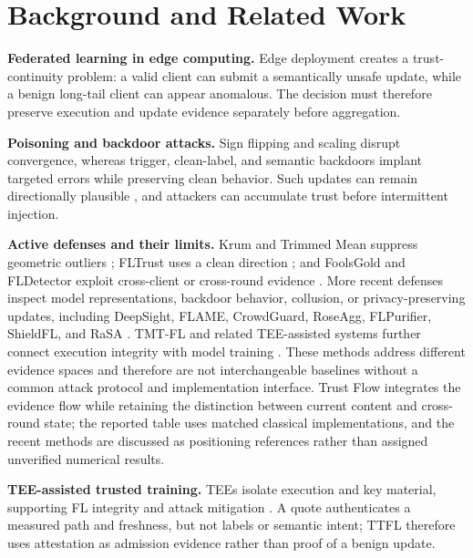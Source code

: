 \documentclass[conference,compsoc]{IEEEtran}
\begin{document}
\section{Background and Related Work}

\textbf{Federated learning in edge computing.} Edge deployment creates a trust-continuity problem: a valid client can submit a semantically unsafe update, while a benign long-tail client can appear anomalous. The decision must therefore preserve execution and update evidence separately before aggregation.

\textbf{Poisoning and backdoor attacks.} Sign flipping and scaling disrupt convergence, whereas trigger, clean-label, and semantic backdoors implant targeted errors while preserving clean behavior. Such updates can remain directionally plausible \cite{bagdasaryan2020backdoor,wang2019neuralcleanse}, and attackers can accumulate trust before intermittent injection.

\textbf{Active defenses and their limits.} Krum and Trimmed Mean suppress geometric outliers \cite{blanchard2017krum,yin2018byzantine}; FLTrust uses a clean direction \cite{cao2021fltrust}; and FoolsGold and FLDetector exploit cross-client or cross-round evidence \cite{fung2020foolsgold,fldetector2022}. More recent defenses inspect model representations, backdoor behavior, collusion, or privacy-preserving updates, including DeepSight, FLAME, CrowdGuard, RoseAgg, FLPurifier, ShieldFL, and RaSA \cite{deepsight2022,flame2022,crowdguard2024,roseagg,flpurifier,shieldfl,wang2025rasa}. TMT-FL and related TEE-assisted systems further connect execution integrity with model training \cite{lu2025tmt}. These methods address different evidence spaces and therefore are not interchangeable baselines without a common attack protocol and implementation interface. Trust Flow integrates the evidence flow while retaining the distinction between current content and cross-round state; the reported table uses matched classical implementations, and the recent methods are discussed as positioning references rather than assigned unverified numerical results.

\textbf{TEE-assisted trusted training.} TEEs isolate execution and key material, supporting FL integrity and attack mitigation \cite{r1_tee_integrity,xu2021distributed,zhang2025rppfl,r5_tee_mitigating,lu2025tmt}. A quote authenticates a measured path and freshness, but not labels or semantic intent; TTFL therefore uses attestation as admission evidence rather than proof of a benign update.
\end{document}

